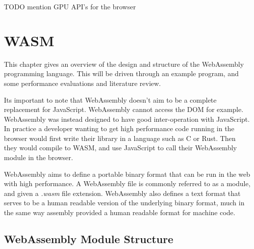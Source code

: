\documentclass[11pt]{book}
\begin{document}
TODO mention GPU API's for the browser








\chapter{WASM}
This chapter gives an overview of the design and structure of the WebAssembly programming language. This will be driven through an example program, and some performance evaluations and literature review. 



Its important to note that WebAssembly doesn't aim to be a complete replacement for JavaScript. WebAssembly cannot access the DOM for example. WebAssembly was instead designed to have good inter-operation with JavaScript. In practice a developer wanting to get high performance code running in the browser would first write their library in a language such as C or Rust. Then they would compile to WASM, and use JavaScript to call their WebAssembly module in the browser. 




WebAssembly aims to define a portable binary format that can be run in the web with high performance. A WebAssembly file is commonly referred to as a module, and given a \textit{.wasm} file extension. WebAssembly also defines a text format that serves to be a human readable version of the underlying binary format, much in the same way assembly provided a human readable format for machine code. 



\section{WebAssembly Module Structure}
\end{document}
